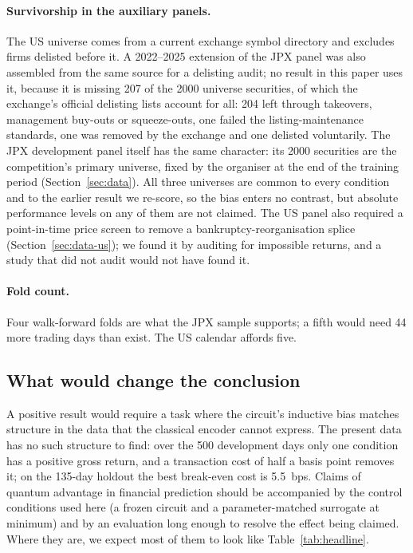 \paragraph{Survivorship in the auxiliary panels.}
The US universe comes from a current exchange symbol directory and excludes
firms delisted before it. A 2022--2025 extension of the JPX panel was also
assembled from the same source for a delisting audit; no result in this paper
uses it, because it is missing
\num{207} of the \num{2000} universe securities, of which the exchange's
official delisting lists account for all: \num{204} left through takeovers,
management buy-outs or squeeze-outs, one failed the listing-maintenance
standards, one was removed by the exchange and one delisted voluntarily. The
JPX development panel itself has the same character: its \num{2000} securities
are the competition's primary universe, fixed by the organiser at the end of
the training period (Section~\ref{sec:data}). All three universes are common
to every condition and to the earlier result we re-score, so the bias enters
no contrast, but absolute performance levels on any of them are not claimed. The US panel also
required a point-in-time price screen to remove a bankruptcy-reorganisation
splice (Section~\ref{sec:data-us}); we found it by auditing for impossible
returns, and a study that did not audit would not have found it.

\paragraph{Fold count.}
Four walk-forward folds are what the JPX sample supports; a fifth would need
\num{44} more trading days than exist. The US calendar affords five.

\subsection{What would change the conclusion}
A positive result would require a task where the circuit's inductive bias
matches structure in the data that the classical encoder cannot express. The
present data has no such structure to find: over the \num{500} development
days only one condition has a positive gross return, and a transaction cost of
half a basis point removes it; on the \num{135}-day holdout the best
break-even cost is \SI{5.5}{bps}. Claims of quantum
advantage in financial prediction should be accompanied by the control
conditions used here (a frozen circuit and a parameter-matched surrogate at
minimum) and by an evaluation long enough to resolve the effect being
claimed. Where they are, we expect most of them to look like
Table~\ref{tab:headline}.
